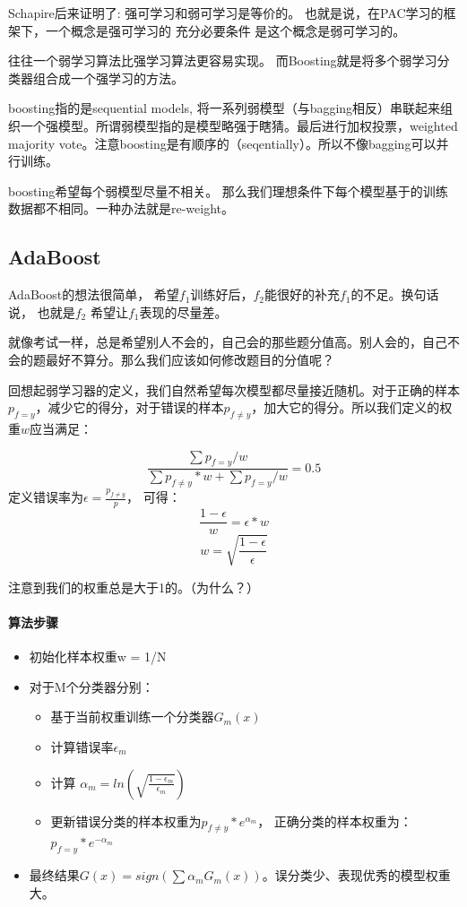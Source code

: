 \documentclass[12pt,a4paper,oneside]{article}
\begin{document}
\begin{CJK*}{UTF8}{gbsn}
Schapire后来证明了: 强可学习和弱可学习是等价的。 也就是说，在PAC学习的框架下，一个概念是强可学习的 充分必要条件 是这个概念是弱可学习的。

往往一个弱学习算法比强学习算法更容易实现。 而Boosting就是将多个弱学习分类器组合成一个强学习的方法。

boosting指的是sequential models, 将一系列弱模型（与bagging相反）串联起来组织一个强模型。所谓弱模型指的是模型略强于瞎猜。最后进行加权投票，weighted majority vote。注意boosting是有顺序的（seqentially）。所以不像bagging可以并行训练。

boosting希望每个弱模型尽量不相关。 那么我们理想条件下每个模型基于的训练数据都不相同。一种办法就是re-weight。

\subsection{AdaBoost}
AdaBoost的想法很简单， 希望$f_{1}$训练好后，$f_{2}$能很好的补充$f_{1}$的不足。换句话说， 也就是$f_{2}$ 希望让$f_{1}$表现的尽量差。

就像考试一样，总是希望别人不会的，自己会的那些题分值高。别人会的，自己不会的题最好不算分。那么我们应该如何修改题目的分值呢？

回想起弱学习器的定义，我们自然希望每次模型都尽量接近随机。对于正确的样本$p_{f=y}$，减少它的得分，对于错误的样本$p_{f\neq y }$，加大它的得分。所以我们定义的权重$w$应当满足：

$$\frac{\sum p_{f= y} / w}{\sum p_{f\neq y } * w+ \sum p_{f=y } / w} =0.5$$
定义错误率为$\epsilon= \frac{p_{f\neq y}}{p}$， 可得：
$$ \frac{1-\epsilon}{w} = \epsilon * w $$
$$w = \sqrt{\frac{1-\epsilon}{\epsilon}}$$

注意到我们的权重总是大于1的。（为什么？）

\paragraph{算法步骤}

\begin{itemize}
\item 初始化样本权重w = 1/N
\item 对于M个分类器分别： 
\begin{itemize}
\item 基于当前权重训练一个分类器$G_{m}(x)$
\item 计算错误率$\epsilon_{m}$
\item 计算 $\alpha_{m} = ln\left( \sqrt{\frac{1-\epsilon_{m}}{\epsilon_{m}}} \right)$
\item 更新错误分类的样本权重为$ p_{f\neq y }* e^{\alpha_{m}}$， 正确分类的样本权重为：$p_{f= y}* e^{- \alpha_{m}}$
\end{itemize}
\item 最终结果$G(x)=sign(\sum \alpha_{m} G_{m}(x))$。误分类少、表现优秀的模型权重大。
\end{itemize}


\end{CJK*}
\end{document}
